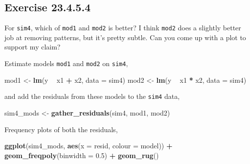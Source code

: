 \documentclass[]{book}
\newenvironment{Shaded}{\begin{snugshade}}{\end{snugshade}}
\newcommand{\DataTypeTok}[1]{\textcolor[rgb]{0.13,0.29,0.53}{#1}}
\newcommand{\FloatTok}[1]{\textcolor[rgb]{0.00,0.00,0.81}{#1}}
\newcommand{\KeywordTok}[1]{\textcolor[rgb]{0.13,0.29,0.53}{\textbf{#1}}}
\newcommand{\NormalTok}[1]{#1}
\newcommand{\OperatorTok}[1]{\textcolor[rgb]{0.81,0.36,0.00}{\textbf{#1}}}
\newcommand{\StringTok}[1]{\textcolor[rgb]{0.31,0.60,0.02}{#1}}
\theoremstyle{plain}
\theoremstyle{remark}
\begin{document}
\hypertarget{exercise-23.4.5.4}{%
\subsection*{\texorpdfstring{Exercise {23.4.5.4}}{Exercise 23.4.5.4}}\label{exercise-23.4.5.4}}

For \texttt{sim4}, which of \texttt{mod1} and \texttt{mod2} is better?
I think \texttt{mod2} does a slightly better job at removing patterns, but it's pretty subtle.
Can you come up with a plot to support my claim?

Estimate models \texttt{mod1} and \texttt{mod2} on \texttt{sim4},

\begin{Shaded}
\begin{Highlighting}[]
\NormalTok{mod1 <-}\StringTok{ }\KeywordTok{lm}\NormalTok{(y }\OperatorTok{~}\StringTok{ }\NormalTok{x1 }\OperatorTok{+}\StringTok{ }\NormalTok{x2, }\DataTypeTok{data =}\NormalTok{ sim4)}
\NormalTok{mod2 <-}\StringTok{ }\KeywordTok{lm}\NormalTok{(y }\OperatorTok{~}\StringTok{ }\NormalTok{x1 }\OperatorTok{*}\StringTok{ }\NormalTok{x2, }\DataTypeTok{data =}\NormalTok{ sim4)}
\end{Highlighting}
\end{Shaded}

and add the residuals from these models to the \texttt{sim4} data,

\begin{Shaded}
\begin{Highlighting}[]
\NormalTok{sim4_mods <-}\StringTok{ }\KeywordTok{gather_residuals}\NormalTok{(sim4, mod1, mod2)}
\end{Highlighting}
\end{Shaded}

Frequency plots of both the residuals,

\begin{Shaded}
\begin{Highlighting}[]

\KeywordTok{ggplot}\NormalTok{(sim4_mods, }\KeywordTok{aes}\NormalTok{(}\DataTypeTok{x =}\NormalTok{ resid, }\DataTypeTok{colour =}\NormalTok{ model)) }\OperatorTok{+}
\StringTok{  }\KeywordTok{geom_freqpoly}\NormalTok{(}\DataTypeTok{binwidth =} \FloatTok{0.5}\NormalTok{) }\OperatorTok{+}
\StringTok{  }\KeywordTok{geom_rug}\NormalTok{()}
\end{Highlighting}
\end{Shaded}
\end{document}
